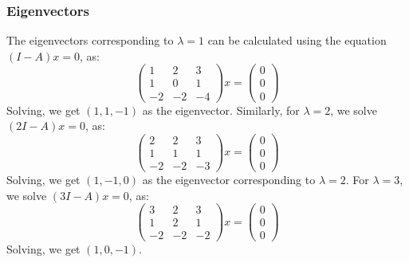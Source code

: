 \documentclass{article}[12pt]
\begin{document}
\subsubsection{Eigenvectors}
The eigenvectors corresponding to $\lambda=1$ can be calculated using
the equation $(I-A)x=0$, as:
\[
\begin{pmatrix}
1 & 2 & 3 \\
1 & 0 & 1 \\
-2 & -2 & -4
\end{pmatrix} x = \begin{pmatrix} 0 \\ 0 \\ 0 \end{pmatrix}
\]
Solving, we get $(1,1,-1)$ as the eigenvector.
Similarly, for $\lambda=2$, we solve $(2I-A)x=0$, as:
\[
\begin{pmatrix}
2 & 2 & 3 \\
1 & 1 & 1 \\
-2 & -2 & -3
\end{pmatrix} x = \begin{pmatrix} 0 \\ 0 \\ 0 \end{pmatrix}
\]
Solving, we get $(1,-1,0)$ as the eigenvector corresponding to $\lambda=2$.
For $\lambda=3$, we solve $(3I-A)x=0$, as:
\[
\begin{pmatrix}
3 & 2 & 3 \\
1 & 2 & 1 \\
-2 & -2 & -2
\end{pmatrix} x = \begin{pmatrix} 0 \\ 0 \\ 0 \end{pmatrix}
\]
Solving, we get $(1,0,-1)$. 
\end{document}
